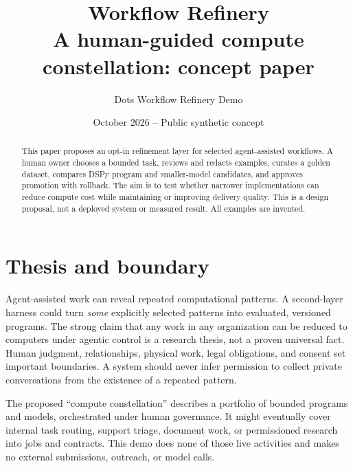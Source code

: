 \documentclass[11pt]{article}
\title{\textcolor{ink}{Workflow Refinery}\\\large A human-guided compute constellation: concept paper}
\author{Dots Workflow Refinery Demo}
\date{October 2026 -- Public synthetic concept}
\begin{document}
\maketitle
\begin{abstract}
This paper proposes an opt-in refinement layer for selected agent-assisted workflows. A human owner chooses a bounded task, reviews and redacts examples, curates a golden dataset, compares DSPy program and smaller-model candidates, and approves promotion with rollback. The aim is to test whether narrower implementations can reduce compute cost while maintaining or improving delivery quality. This is a design proposal, not a deployed system or measured result. All examples are invented.
\end{abstract}
\section{Thesis and boundary}
Agent-assisted work can reveal repeated computational patterns. A second-layer harness could turn \emph{some} explicitly selected patterns into evaluated, versioned programs. The strong claim that any work in any organization can be reduced to computers under agentic control is a research thesis, not a proven universal fact. Human judgment, relationships, physical work, legal obligations, and consent set important boundaries. A system should never infer permission to collect private conversations from the existence of a repeated pattern.

The proposed ``compute constellation'' describes a portfolio of bounded programs and models, orchestrated under human governance. It might eventually cover internal task routing, support triage, document work, or permissioned research into jobs and contracts. This demo does none of those live activities and makes no external submissions, outreach, or model calls.
\end{document}
